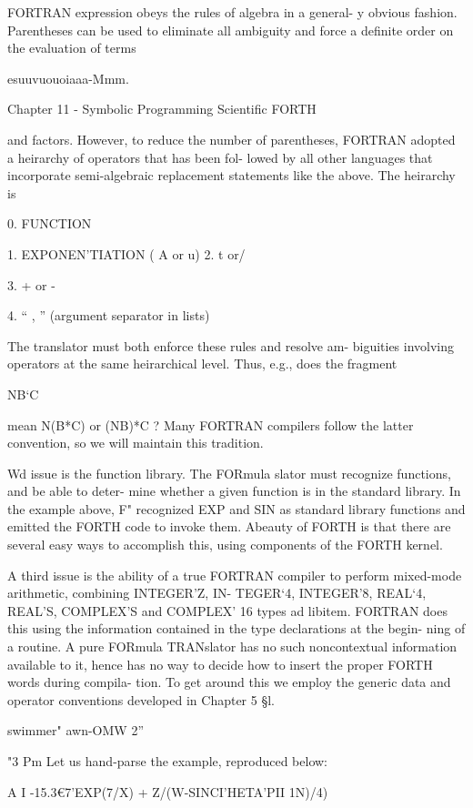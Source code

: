 FORTRAN expression obeys the rules of algebra in a general-
y obvious fashion. Parentheses can be used to eliminate all
ambiguity and force a definite order on the evaluation of terms

esuuvuouoiaaa-Mmm.

Chapter 11 - Symbolic Programming Scientific FORTH

and factors. However, to reduce the number of parentheses,
FORTRAN adopted a heirarchy of operators that has been fol-
lowed by all other languages that incorporate semi-algebraic
replacement statements like the above. The heirarchy is

0. FUNCTION

1. EXPONEN'TIATION ( A or u)
2. t or/

3. + or -

4. “ , ” (argument separator in lists)

The translator must both enforce these rules and resolve am-
biguities involving operators at the same heirarchical level. Thus,
e.g., does the fragment

NB‘C

mean N(B*C) or (NB)*C ? Many FORTRAN compilers follow
the latter convention, so we will maintain this tradition.

Wd issue is the function library. The FORmula
slator must recognize functions, and be able to deter-
mine whether a given function is in the standard library. In the
example above, F" recognized EXP and SIN as standard library
functions and emitted the FORTH code to invoke them. Abeauty
of FORTH is that there are several easy ways to accomplish this,
using components of the FORTH kernel.

A third issue is the ability of a true FORTRAN compiler to
perform mixed-mode arithmetic, combining INTEGER'Z, IN-
TEGER‘4, INTEGER'8, REAL‘4, REAL'S, COMPLEX'S
and COMPLEX' 16 types ad libitem. FORTRAN does this using
the information contained in the type declarations at the begin-
ning of a routine. A pure FORmula TRANslator has no such
noncontextual information available to it, hence has no way to
decide how to insert the proper FORTH words during compila-
tion. To get around this we employ the generic data and operator
conventions developed in Chapter 5 §l.

swimmer" awn-OMW 2”

"3 Pm
Let us hand-parse the example, reproduced below:

A I -15.3€7'EXP(7/X) + Z/(W-SINCI'HETA'PII 1N)/4)

